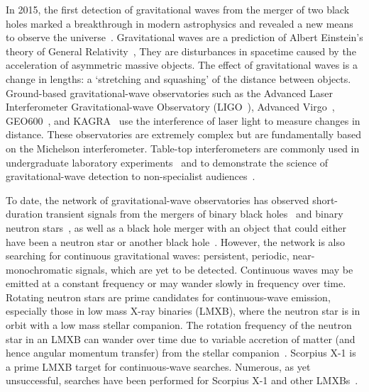 \documentclass[paper-main.tex]{subfiles}
\begin{document}
In 2015, the first detection of gravitational waves from the merger of two black holes marked a breakthrough in modern astrophysics and revealed a new means to observe the universe~\cite{GW150914}.
Gravitational waves are a prediction of Albert Einstein's theory of General Relativity~\cite{Einstein:1916}, 
They are disturbances in spacetime caused by the acceleration of asymmetric massive objects.
The effect of gravitational waves is a change in lengths: a `stretching and squashing' of the distance between objects. 
Ground-based gravitational-wave observatories such as the Advanced Laser Interferometer Gravitational-wave Observatory (LIGO~\cite{AdvancedLIGO:2015}), Advanced Virgo~\cite{AdvancedVirgo:2015}, GEO600~\cite{GEO600:2010}, and KAGRA~\cite{KAGRA:2013} use the interference of laser light to measure changes in distance. 
These observatories are extremely complex but are fundamentally based on the Michelson interferometer. 
Table-top interferometers are commonly used in undergraduate laboratory experiments~\cite{UgoliniEtAl:2019} and to demonstrate the science of gravitational-wave detection to non-specialist audiences~\cite{ThorLabsIFO,NikhefIFO,AMIGO:online,TTExhibit:2020,LIGOIFOGlue,LIGOIFOMagnets}.


To date, the network of gravitational-wave observatories has observed short-duration transient signals from the mergers of binary black holes~\cite{GW150914,GW151226,GW170104,GW170814,GW190521,GWTC-1:2018,GWTC-2:2020} and binary neutron stars~\cite{GW170817,GW170817multi,GW190425,GWTC-1:2018,GWTC-2:2020}, as well as a black hole merger with an object that could either have been a neutron star or another black hole~\cite{GW190814}. 
However, the network is also searching for continuous gravitational waves: persistent, periodic, near-monochromatic signals, which are yet to be detected. 
Continuous waves may be emitted at a constant frequency or may wander slowly in frequency over time. 
Rotating neutron stars are prime candidates for continuous-wave emission, especially those in low mass X-ray binaries (LMXB), where the neutron star is in orbit with a low mass stellar companion.
The rotation frequency of the neutron star in an LMXB can wander over time due to variable accretion of matter (and hence angular momentum transfer) from the stellar companion~\cite{xraybinaries:1997}. 
Scorpius X-1 is a prime LMXB target for continuous-wave searches. 
Numerous, as yet unsuccessful, searches have been performed for Scorpius X-1 and other LMXBs~\cite{ScoX1O2Viterbi:2019, ScoX1ViterbiO1:2017, RadiometerO1O2:2019, SearchRadiometerO1:2017, SearchCrossCorrO1:2017, ScoX1ViterbiO1:2017, SearchTwoSpecS6:2017, MiddletonEtAlO2LMXBs:2020}. 
\end{document}
